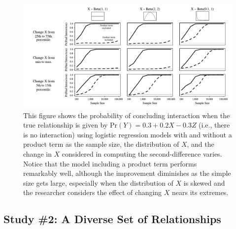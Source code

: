 \documentclass[12pt]{article}
\begin{document}
\begin{figure}
\begin{center}
\includegraphics[width=\linewidth]{fig/fig-fixed.pdf}
\end{center}
\caption{This figure shows the probability of concluding interaction when the true relationship is given by $\text{Pr}(Y) = 0.3 + 0.2X - 0.3Z$ (i.e., there is no interaction) using logistic regression models with and without a product term as the sample size, the distribution of $X$, and the change in $X$ considered in computing the second-difference varies. Notice that the model including a product term performs remarkably well, although the improvement diminishes as the simple size gets large, especially when the distribution of $X$ is skewed and the researcher considers the effect of changing $X$ nears its extremes.}\label{fig:fixed}
\end{figure}

\subsection*{Study \#2: A Diverse Set of Relationships}
\end{document}

